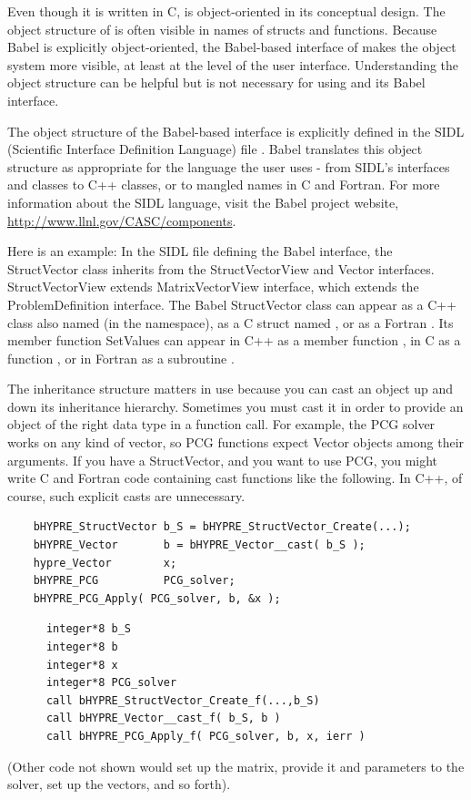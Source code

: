 Even though it is written in C, \hypre{} is object-oriented in its
conceptual design.  The object structure of \hypre{} is often visible
in names of structs and functions.  Because Babel is explicitly
object-oriented, the Babel-based interface of \hypre{} makes the
\hypre{} object system more visible, at least at the level of the
user interface.  Understanding the \hypre{} object structure can be
helpful but is not necessary for using \hypre{} and its Babel
interface.

The object structure of the Babel-based interface is explicitly
defined in the SIDL (Scientific Interface Definition Language) file
.  Babel translates this object structure as
appropriate for the language the user uses - from SIDL's interfaces
and classes to C++ classes, or to mangled names in C and Fortran.
For more information about the SIDL language, visit the Babel project
website, \url{http://www.llnl.gov/CASC/components}.

Here is an example: In the SIDL file defining the Babel interface, the
StructVector class inherits from the StructVectorView and Vector
interfaces.  StructVectorView extends MatrixVectorView interface,
which extends the ProblemDefinition interface.  The Babel StructVector
class can appear as a C++ class also named  (in the
 namespace), as a C struct named
, or as a Fortran
.  Its member function SetValues can appear in C++ as a
member function , in C as a function
, or in Fortran as a subroutine
.

The inheritance structure matters in use because you can cast an
object up and down its inheritance hierarchy.  Sometimes you must cast
it in order to provide an object of the right data type in a function
call.  For example, the PCG solver works on any kind of vector, so PCG
functions expect Vector objects among their arguments.  If you have a
StructVector, and you want to use PCG, you might write C and Fortran
code containing cast functions like the following.  In C++, of course,
such explicit casts are unnecessary.
\begin{verbatim}
    bHYPRE_StructVector b_S = bHYPRE_StructVector_Create(...);
    bHYPRE_Vector       b = bHYPRE_Vector__cast( b_S );
    hypre_Vector        x;
    bHYPRE_PCG          PCG_solver;
    bHYPRE_PCG_Apply( PCG_solver, b, &x );
\end{verbatim}
\begin{verbatim}
      integer*8 b_S
      integer*8 b
      integer*8 x
      integer*8 PCG_solver
      call bHYPRE_StructVector_Create_f(...,b_S)
      call bHYPRE_Vector__cast_f( b_S, b )
      call bHYPRE_PCG_Apply_f( PCG_solver, b, x, ierr )
\end{verbatim}
(Other code not shown would set up the matrix, provide it and
parameters to the solver, set up the vectors, and so forth).

